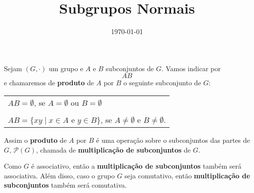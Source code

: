 \documentclass{beamer}
\title{Subgrupos Normais}
\author[\autor]{\autor}
\institute[\instituto]{\instituto}
\date{\today}
\begin{document}
    \begin{frame}
        \maketitle
    \end{frame}


    \begin{frame}
        Sejam $(G, \cdot)$ um grupo e $A$ e $B$ subconjuntos de $G$. Vamos indicar por
        \[
            AB
        \]
        e chamaremos de \textbf{produto} de $A$ por $B$ o seguinte subconjunto de $G$:
        \begin{center}
            \begin{tabular}{l}
                $AB = \emptyset$, se $A = \emptyset$ ou $B = \emptyset$\\
                \\
                $AB = \{xy \mid x \in A \mbox{ e } y \in B\}$, se  $A \ne \emptyset$  e $B \ne \emptyset$.
            \end{tabular}
        \end{center}

        \vspace{.3cm}

        Assim o \textbf{produto} de $A$ por $B$ é uma operação sobre o subconjuntos das partes de $G$, $\mathcal{P}(G)$, chamada de \textbf{multiplicação de subconjuntos} de $G$.

        \vspace{.3cm}

        Como $G$ é associativo, então a \textbf{multiplicação de subconjuntos} também será associativa. Além disso, caso o grupo $G$ seja comutativo, então \textbf{multiplicação de subconjuntos} também será comutativa.
    \end{frame}
\end{document}
